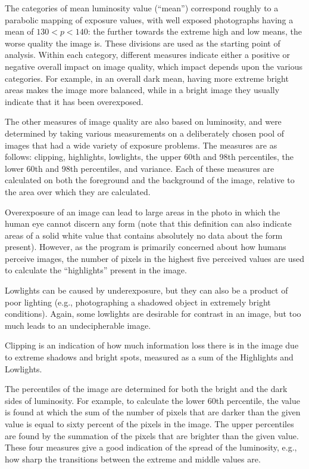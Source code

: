 \documentclass[10pt,twocolumn,letterpaper]{article}
\begin{document}
The categories of mean luminosity value (“mean”) correspond roughly to a parabolic mapping of exposure values, with well exposed photographs having a mean of \(130<p<140\): the further towards the extreme high and low means, the worse quality the image is. These divisions are used as the starting point of analysis. Within each category, different measures indicate either a positive or negative overall impact on image quality, which impact depends upon the various categories. For example, in an overall dark mean, having more extreme bright areas makes the image more balanced, while in a bright image they usually indicate that it has been overexposed.

The other measures of image quality are also based on luminosity, and were determined by taking various measurements on a deliberately chosen pool of images that had a wide variety of exposure problems. The measures are as follows: clipping, highlights, lowlights, the upper 60th and 98th percentiles, the lower 60th and 98th percentiles, and variance. Each of these measures are calculated on both the foreground and the background of the image, relative to the area over which they are calculated.

Overexposure of an image can lead to large areas in the photo in which the human eye cannot discern any form (note that this definition can also indicate areas of a solid white value that contains absolutely no data about the form present). However, as the program is primarily concerned about how humans perceive images, the number of pixels in the highest five perceived values are used to calculate the “highlights” present in the image.

Lowlights can be caused by underexposure, but they can also be a product of poor lighting (e.g., photographing a shadowed object in extremely bright conditions). Again, some lowlights are desirable for contrast in an image, but too much leads to an undecipherable image.

Clipping is an indication of how much information loss there is in the image due to extreme shadows and bright spots, measured as a sum of the Highlights and Lowlights.

The percentiles of the image are determined for both the bright and the dark sides of luminosity. For example, to calculate the lower 60th percentile, the value is found at which the sum of the number of pixels that are darker than the given value is equal to sixty percent of the pixels in the image. The upper percentiles are found by the summation of the pixels that are brighter than the given value. These four measures give a good indication of the spread of the luminosity, e.g., how sharp the transitions between the extreme and middle values are.
\end{document}
